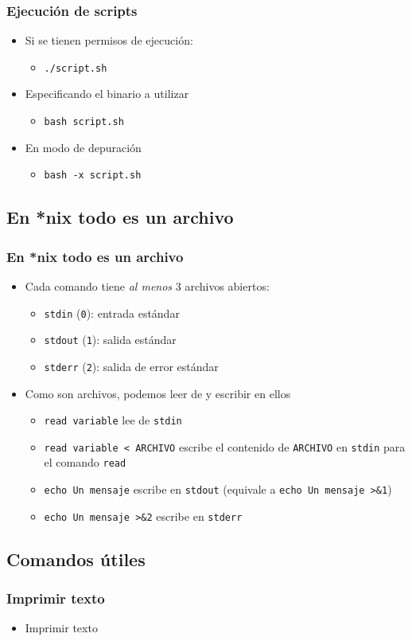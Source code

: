 \begin{frame}
  \frametitle{Ejecución de scripts}
  \begin{itemize}
    \item Si se tienen permisos de ejecución:
    \begin{itemize}
      \item \texttt{./script.sh}
    \end{itemize}
    \item Especificando el binario a utilizar
    \begin{itemize}
      \item \texttt{bash script.sh}
    \end{itemize}
    \item En modo de depuración
    \begin{itemize}
      \item \texttt{bash -x script.sh}
    \end{itemize}
  \end{itemize}
\end{frame}

\subsection{En *nix todo es un archivo}

\begin{frame}
  \frametitle{En *nix todo es un archivo}
  \begin{itemize}
    \item Cada comando tiene \textit{al menos} 3 archivos abiertos:
    \begin{itemize}
      \item \texttt{stdin} (\texttt{0}): entrada estándar
      \item \texttt{stdout} (\texttt{1}): salida estándar
      \item \texttt{stderr} (\texttt{2}): salida de error estándar
    \end{itemize}
    \item Como son archivos, podemos leer de y escribir en ellos
    \begin{itemize}
      \item \texttt{read variable} lee de \texttt{stdin}
      \item \texttt{read variable < ARCHIVO} escribe el contenido de \texttt{ARCHIVO} en \texttt{stdin}
        para el comando \texttt{read}
      \item \texttt{echo Un mensaje} escribe en \texttt{stdout} (equivale a \texttt{echo Un mensaje >\&1})
      \item \texttt{echo Un mensaje >\&2} escribe en \texttt{stderr}
    \end{itemize}
  \end{itemize}
\end{frame}

\subsection{Comandos útiles}

\begin{frame}
  \frametitle{Imprimir texto}
  \begin{itemize}
    \item Imprimir texto
  \end{itemize}
\end{frame}
